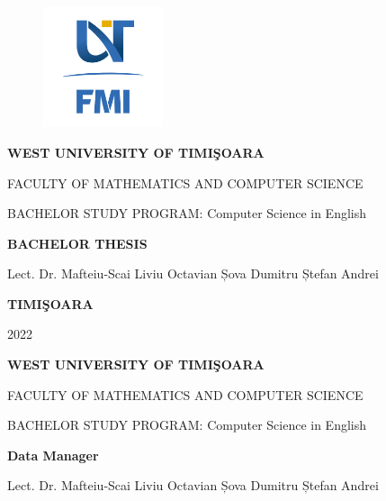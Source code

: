\documentclass[12pt,a4paper,openany]{book}
\theoremstyle{definition}
\theoremstyle{remark}
\begin{document}
\sloppy

\thispagestyle{empty}
\begin{center}
\begin{figure}[h!]
\vspace{-20pt}
\begin{center}
\includegraphics[width=100pt]{FMI-03.png}
\end{center}
\end{figure}


{\large{\bf WEST UNIVERSITY OF TIMI\c SOARA

FACULTY OF MATHEMATICS AND COMPUTER SCIENCE

BACHELOR STUDY PROGRAM:  Computer Science in English }}

\vspace{120pt}
{\huge {\bf BACHELOR THESIS}}

\vspace{160pt}
\end{center}

{\large{}

\noindent Lect. Dr. Mafteiu-Scai Liviu Octavian\hfill 
\noindent  Șova Dumitru Ștefan Andrei}

\vfill
\begin{center}
{\bf TIMI\c SOARA

2022}
\end{center}
\newpage
\thispagestyle{empty}
\begin{center}
{\large{\bf WEST UNIVERSITY OF TIMI\c SOARA
		
FACULTY OF MATHEMATICS AND COMPUTER SCIENCE
		
BACHELOR STUDY PROGRAM:  Computer Science in English}}

\vspace{200pt}
{\huge {\bf Data Manager }}

\vspace{153pt}
\end{center}

{\large{}

\noindent Lect. Dr. Mafteiu-Scai Liviu Octavian\hfill
\noindent Șova Dumitru Ștefan Andrei}
 
\end{document}
